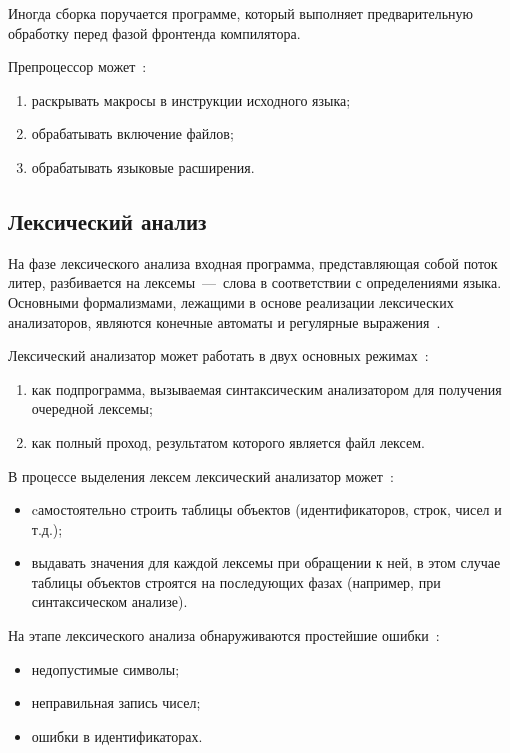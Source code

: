 Иногда сборка поручается программе, который выполняет предварительную обработку перед фазой фронтенда компилятора. 

Препроцессор может~\cite{aho2003,vladimirtov2004struct}:
\begin{enumerate}
    \item раскрывать макросы в инструкции исходного языка;
    \item обрабатывать включение файлов;
    \item обрабатывать языковые расширения.
\end{enumerate}

\subsection{Лексический анализ}

На фазе лексического анализа входная программа, представляющая собой поток литер, разбивается на лексемы~---~слова в соответствии с определениями языка. Основными формализмами, лежащими в основе реализации лексических анализаторов, являются конечные автоматы и регулярные выражения~\cite{serebrykov2001}.

Лексический анализатор может работать в двух основных режимах~\cite{serebrykov2001}:
\begin{enumerate}
    \item как подпрограмма, вызываемая синтаксическим анализатором для получения очередной лексемы;
    \item как полный проход, результатом которого является файл лексем.
\end{enumerate}

В процессе выделения лексем лексический анализатор может~\cite{serebrykov2001}:
\begin{itemize}
    \item cамостоятельно строить таблицы объектов (идентификаторов, строк, чисел и т.д.);
    \item выдавать значения для каждой лексемы при обращении к ней, в этом случае таблицы объектов строятся на последующих фазах (например, при синтаксическом анализе).
\end{itemize}

На этапе лексического анализа обнаруживаются простейшие ошибки~\cite{serebrykov2001}:
\begin{itemize}
    \item недопустимые символы;
    \item неправильная запись чисел;
    \item ошибки в идентификаторах.
\end{itemize}




\newpage

